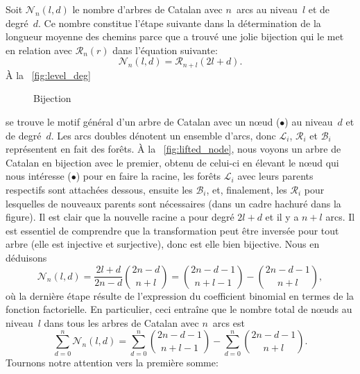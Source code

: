 Soit \(\mathcal{N}_n(l,d)\) le nombre d'arbres de Catalan avec
\(n\)~arcs au niveau~\(l\) et de degré~\(d\). Ce nombre constitue
l'étape suivante dans la détermination de la longueur moyenne des
chemins parce que \cite{Ruskey_1983} a trouvé une jolie bijection qui
le met en relation avec \(\mathcal{R}_n(r)\) dans l'équation suivante:
\begin{equation*}
\mathcal{N}_n(l,d) = \mathcal{R}_{n+l}(2l+d).
\end{equation*}
À la \fig~\ref{fig:level_deg}
\begin{figure}
\centering
{}
\quad
{}
\caption{Bijection}
\label{fig:bij_root_level}
\end{figure}
se trouve le motif général d'un arbre de Catalan avec un nœud
(\(\bullet\)) au niveau~\(d\) et de degré~\(d\). Les arcs doubles
dénotent un ensemble d'arcs, donc \(\mathcal{L}_i\), \(\mathcal{R}_i\)
et \(\mathcal{B}_i\) représentent en fait des forêts. À la
\fig~\ref{fig:lifted_node}, nous voyons un arbre de Catalan en
bijection avec le premier, obtenu de celui-ci en élevant le nœud qui
nous intéresse (\(\bullet\)) pour en faire la racine, les forêts
\(\mathcal{L}_i\) avec leurs parents respectifs sont attachées
dessous, ensuite les \(\mathcal{B}_i\), et, finalement, les
\(\mathcal{R}_i\) pour lesquelles de nouveaux parents sont nécessaires
(dans un cadre hachuré dans la figure). Il est clair que la nouvelle
racine a pour degré \(2l+d\) et il y a \(n+l\) arcs. Il est essentiel
de comprendre que la transformation peut être inversée pour tout arbre
(elle est injective et surjective), donc est elle bien bijective. Nous
en déduisons
\begin{equation*}
\mathcal{N}_n(l,d) = \frac{2l+d}{2n-d}\binom{2n-d}{n+l}
= \binom{2n-d-1}{n+l-1} - \binom{2n-d-1}{n+l},
\end{equation*}
où la dernière étape résulte de l'expression du coefficient binomial en termes de la fonction factorielle. En particulier, ceci entraîne que le nombre total de nœuds au niveau~\(l\) dans tous les arbres de Catalan avec \(n\)~arcs est
\begin{equation*}
\sum_{d=0}^{n}\mathcal{N}_n(l,d)
  = \sum_{d=0}^{n}\binom{2n-d-1}{n+l-1}
    - \sum_{d=0}^{n}\binom{2n-d-1}{n+l}.
\end{equation*}
Tournons notre attention vers la première somme:
